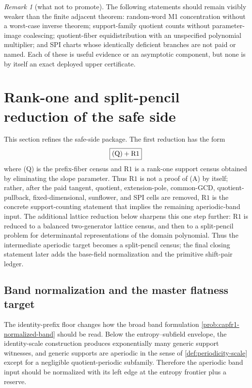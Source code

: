 \documentclass[11pt]{article}
\theoremstyle{definition}
\theoremstyle{remark}
\newtheorem{remark}[remark]{Remark}
\providecommand{\Rone}{\mathrm{R1}}
\begin{document}
\begin{remark}[what not to promote]\label{rem:capfaq-not-to-promote}
The following statements should remain visibly weaker than the finite adjacent theorem: random-word M1 concentration without a worst-case inverse theorem; support-family quotient counts without parameter-image coalescing; quotient-fiber equidistribution with an unspecified polynomial multiplier; and SPI charts whose identically deficient branches are not paid or named.  Each of these is useful evidence or an asymptotic component, but none is by itself an exact deployed upper certificate.
\end{remark}


\section{Rank-one and split-pencil reduction of the safe side}\label{sec:capfr1-programme}

This section refines the safe-side package.  The first reduction has the form
\[
        \boxed{\textup{(Q)}+\Rone}
\]
where \textup{(Q)} is the prefix-fiber census and \(\Rone\) is a rank-one support census obtained by eliminating the slope parameter.  Thus \(\Rone\) is not a proof of \textup{(A)} by itself; rather, after the paid tangent, quotient, extension-pole, common-GCD, quotient-pullback, fixed-dimensional, sunflower, and SPI cells are removed, \(\Rone\) is the concrete support-counting statement that implies the remaining aperiodic-band input.  The additional lattice reduction below sharpens this one step further: \(\Rone\) is reduced to a balanced two-generator lattice census, and then to a split-pencil problem for determinantal representations of the domain polynomial.  Thus the intermediate aperiodic target becomes a split-pencil census; the final closing statement later adds the base-field normalization and the primitive shift-pair ledger.

\subsection{Band normalization and the master flatness target}\label{subsec:capfr1-band-flatness}

The identity-prefix floor changes how the broad band formulation \cref{prob:capfr1-normalized-band} should be read.  Below the entropy--subfield envelope, the identity-scale construction produces exponentially many generic support witnesses, and generic supports are aperiodic in the sense of \cref{def:periodicity-scale} except for a negligible quotient-periodic subfamily.  Therefore the aperiodic band input should be normalized with its left edge at the entropy frontier plus a reserve.
\end{document}
